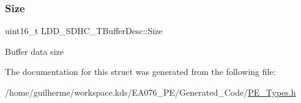 \subsubsection{\texorpdfstring{Size}{Size}}
{\footnotesize\ttfamily uint16\+\_\+t L\+D\+D\+\_\+\+S\+D\+H\+C\+\_\+\+T\+Buffer\+Desc\+::\+Size}

Buffer data size 

The documentation for this struct was generated from the following file\+:\begin{DoxyCompactItemize}
\item 
/home/guilherme/workspace.\+kds/\+E\+A076\+\_\+\+P\+E/\+Generated\+\_\+\+Code/\hyperlink{_p_e___types_8h}{P\+E\+\_\+\+Types.\+h}\end{DoxyCompactItemize}
